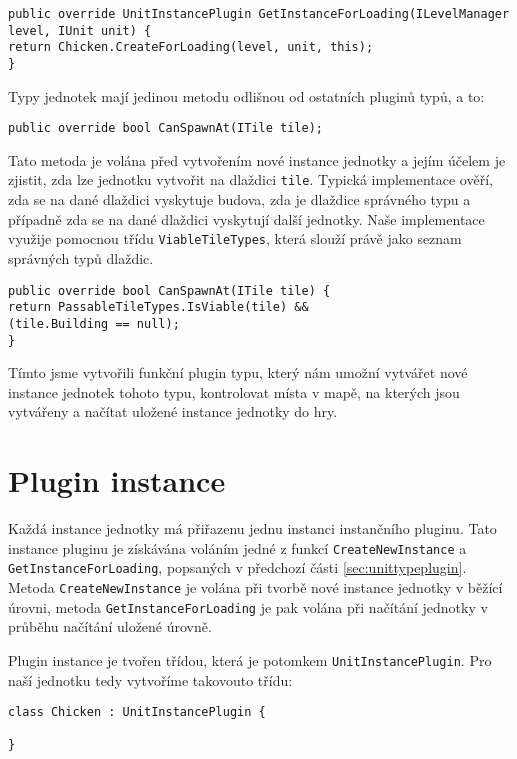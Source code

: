 \begin{lstlisting}
public override UnitInstancePlugin GetInstanceForLoading(ILevelManager level, IUnit unit) {
return Chicken.CreateForLoading(level, unit, this);
}
\end{lstlisting}

Typy jednotek mají jedinou metodu odlišnou od ostatních pluginů typů, a to:

\begin{lstlisting}
public override bool CanSpawnAt(ITile tile);
\end{lstlisting}

Tato metoda je volána před vytvořením nové instance jednotky a jejím účelem je zjistit, zda lze jednotku vytvořit na dlaždici \texttt{tile}. Typická implementace ověří, zda se na dané dlaždici vyskytuje budova, zda je dlaždice správného typu a případně zda se na dané dlaždici vyskytují další jednotky. Naše implementace využije pomocnou třídu \texttt{ViableTileTypes}, která slouží právě jako seznam správných typů dlaždic.

\begin{lstlisting}
public override bool CanSpawnAt(ITile tile) {
return PassableTileTypes.IsViable(tile) && 
(tile.Building == null);
}
\end{lstlisting}

Tímto jsme vytvořili funkční plugin typu, který nám umožní vytvářet nové instance jednotek tohoto typu, kontrolovat místa v mapě, na kterých jsou vytvářeny a načítat uložené instance jednotky do hry.

\section{Plugin instance}
\label{sec:unitinstanceplugin}

Každá instance jednotky má přiřazenu jednu instanci instančního pluginu. Tato instance pluginu je získávána voláním jedné z funkcí \texttt{CreateNewInstance} a \texttt{GetInstanceForLoading}, popsaných v předchozí části \ref{sec:unittypeplugin}. Metoda \texttt{CreateNewInstance} je volána při tvorbě nové instance jednotky v běžící úrovni, metoda \texttt{GetInstanceForLoading} je pak volána při načítání jednotky v průběhu načítání uložené úrovně.

Plugin instance je tvořen třídou, která je potomkem \texttt{UnitInstancePlugin}. Pro naší jednotku tedy vytvoříme takovouto třídu:

\begin{lstlisting}
class Chicken : UnitInstancePlugin {

}
\end{lstlisting}

